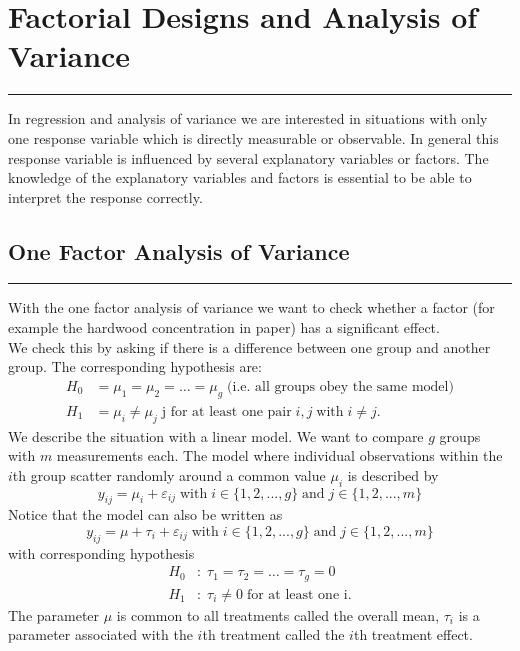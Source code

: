 \section{Factorial Designs and Analysis of Variance}
\noindent\rule[\linienAbstand]{\linewidth}{\linienDickeDick}
In regression and analysis of variance we are interested in situations with only one response variable which is directly measurable or observable. In general this response variable is influenced by several explanatory variables or factors. The knowledge of the explanatory variables and factors is essential to be able to interpret the response correctly.

\subsection{One Factor Analysis of Variance}
\noindent\rule[\linienAbstand]{\linewidth}{\linienDicke}
With the one factor analysis of variance we want to check whether a factor (for example the hardwood concentration in paper) has a significant effect.\\
We check this by asking if there is a difference between one group and another group. The corresponding hypothesis are:
\begin{equation}
  \begin{split}
    H_0 &= \mu_1 = \mu_2 = \dots = \mu_g \; \text{(i.e. all groups obey the same model)}\\
    H_1 &= \mu_i \neq \mu_j \;\text{j for at least one pair}\; i, j \;\text{with}\; i \neq j.
  \end{split}
\end{equation}
We describe the situation with a linear model. We want to compare $g$ groups with $m$ measurements each. The model where individual observations within the $i$th group scatter randomly around a common value $\mu_i$ is described by
\begin{equation}
  y_{ij} = \mu_i + \varepsilon_{ij} \;\text{with}\; i \in \{1, 2, ..., g\} \;\text{and}\; j \in \{1, 2, ...,m\}
\end{equation}
Notice that the model can also be written as
\begin{equation}
  y_{ij} = \mu + \tau_i + \varepsilon_{ij} \;\text{with}\; i \in \{1, 2, ..., g\} \;\text{and}\; j \in \{1, 2, ...,m\}
\end{equation}
with corresponding hypothesis
\begin{equation}
  \begin{split}
    H_0 &: \; \tau_1 = \tau_2 = \dots = \tau_g = 0\\
    H_1 &: \; \tau_i \neq 0 \;\text{for at least one i}.
  \end{split}
\end{equation}
The parameter $\mu$ is common to all treatments called the overall mean, $\tau_i$ is a parameter associated with the $i$th treatment called the $i$th treatment effect.\\


